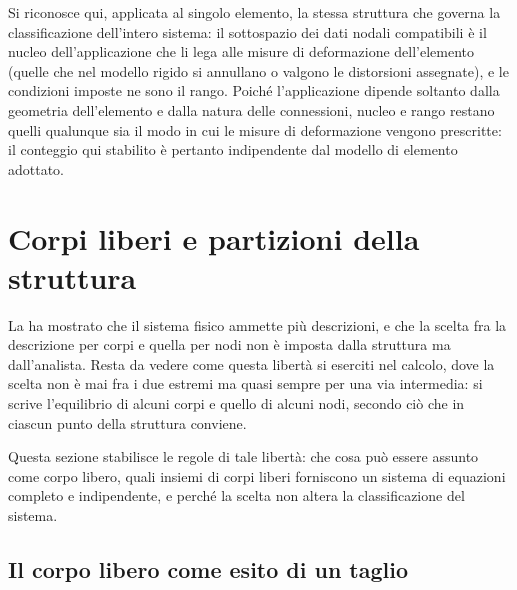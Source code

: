\begin{oss}
		Si riconosce qui, applicata al singolo elemento, la
		stessa struttura che governa la classificazione
		dell'intero sistema: il sottospazio dei dati nodali
		compatibili è il nucleo dell'applicazione che li lega
		alle misure di deformazione dell'elemento (quelle che
		nel modello rigido si annullano o valgono le
		distorsioni assegnate), e le condizioni imposte ne
		sono il rango. Poiché l'applicazione dipende soltanto
		dalla geometria dell'elemento e dalla natura delle
		connessioni, nucleo e rango restano quelli qualunque
		sia il modo in cui le misure di deformazione vengono
		prescritte: il conteggio qui stabilito è pertanto
		indipendente dal modello di elemento adottato.
\end{oss}


\section{Corpi liberi e partizioni della struttura}
\label{sec:partizioni}

La  ha mostrato che il
sistema fisico ammette più descrizioni, e che la scelta fra
la descrizione per corpi e quella per nodi non è imposta
dalla struttura ma dall'analista. Resta da vedere come
questa libertà si eserciti nel calcolo, dove la scelta non
è mai fra i due estremi ma quasi sempre per una via
intermedia: si scrive l'equilibrio di alcuni corpi e quello
di alcuni nodi, secondo ciò che in ciascun punto della
struttura conviene.

Questa sezione stabilisce le regole di tale libertà: che
cosa può essere assunto come corpo libero, quali insiemi di
corpi liberi forniscono un sistema di equazioni completo e
indipendente, e perché la scelta non altera la
classificazione del sistema.


\subsection{Il corpo libero come esito di un taglio}
\label{subsec:corpo_libero}

